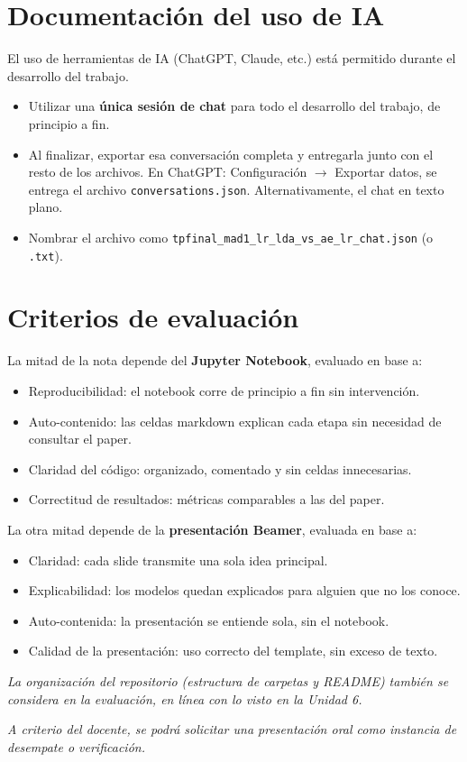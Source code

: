 \documentclass[11pt,a4paper]{article}
\newcommand{\codigo}[1]{\texttt{#1}}
\begin{document}
\section{Documentaci\'on del uso de IA}
El uso de herramientas de IA (ChatGPT, Claude, etc.) est\'a permitido durante el desarrollo del trabajo.
\begin{itemize}[leftmargin=2em,itemsep=2pt]
    \item Utilizar una \textbf{\'unica sesi\'on de chat} para todo el desarrollo del trabajo, de principio a fin.
    \item Al finalizar, exportar esa conversaci\'on completa y entregarla junto con el resto de los archivos. En ChatGPT: Configuraci\'on $\rightarrow$ Exportar datos, se entrega el archivo \codigo{conversations.json}. Alternativamente, el chat en texto plano.
    \item Nombrar el archivo como \codigo{tpfinal\_mad1\_lr\_lda\_vs\_ae\_lr\_chat.json} (o \codigo{.txt}).
\end{itemize}

\section{Criterios de evaluaci\'on}
La mitad de la nota depende del \textbf{Jupyter Notebook}, evaluado en base a:
\begin{itemize}[leftmargin=2em,itemsep=2pt]
    \item Reproducibilidad: el notebook corre de principio a fin sin intervenci\'on.
    \item Auto-contenido: las celdas markdown explican cada etapa sin necesidad de consultar el paper.
    \item Claridad del c\'odigo: organizado, comentado y sin celdas innecesarias.
    \item Correctitud de resultados: m\'etricas comparables a las del paper.
\end{itemize}

La otra mitad depende de la \textbf{presentaci\'on Beamer}, evaluada en base a:
\begin{itemize}[leftmargin=2em,itemsep=2pt]
    \item Claridad: cada slide transmite una sola idea principal.
    \item Explicabilidad: los modelos quedan explicados para alguien que no los conoce.
    \item Auto-contenida: la presentaci\'on se entiende sola, sin el notebook.
    \item Calidad de la presentaci\'on: uso correcto del template, sin exceso de texto.
\end{itemize}

\textit{La organizaci\'on del repositorio (estructura de carpetas y README) tambi\'en se considera en la evaluaci\'on, en l\'inea con lo visto en la Unidad 6.}

\textit{A criterio del docente, se podr\'a solicitar una presentaci\'on oral como instancia de desempate o verificaci\'on.}
\end{document}
